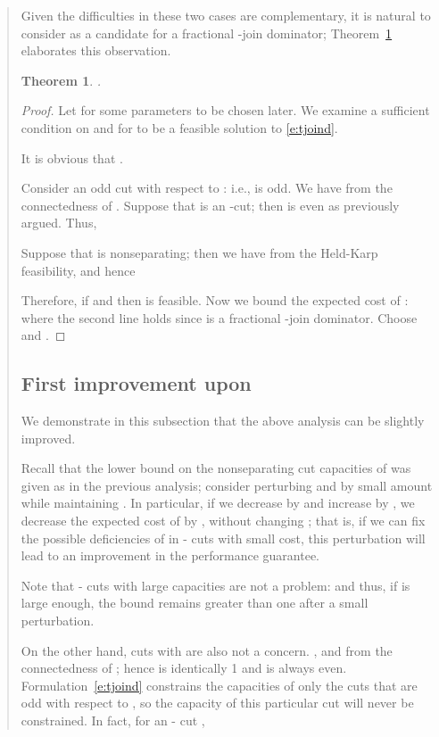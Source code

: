 \documentclass[11pt,letterpaper]{article}
\newtheorem{thm}{Theorem}
\newcommand{\st}{\mbox{-} }
\begin{document}
\begin{quote}
Given the difficulties in these two cases are complementary, it is natural to consider  as a candidate for a fractional -join dominator; Theorem~\ref{t:a53} elaborates this observation.

\begin{thm}\label{t:a53}
.
\end{thm}
\begin{proof}
Let  for some parameters  to be chosen later. We examine a sufficient condition on  and  for  to be a feasible solution to \eqref{e:tjoind}.

It is obvious that .

Consider an odd cut  with respect to : i.e.,  is odd. We have  from the connectedness of . Suppose that  is an -cut; then  is even as previously argued. Thus,

Suppose that  is nonseparating; then we have  from the Held-Karp feasibility, and hence

Therefore, if  and  then  is feasible.
Now we bound the expected cost of :
where the second line holds since  is a fractional -join dominator. Choose  and .
\end{proof}

\subsection{First improvement upon }

We demonstrate in this subsection that the above analysis can be slightly improved.

Recall that the lower bound on the nonseparating cut capacities of  was given as  in the previous analysis; consider perturbing  and  by small amount while maintaining . In particular, if we decrease  by  and increase  by , we decrease the expected cost of  by , without changing ; that is, if we can fix the possible deficiencies of  in \st cuts with small cost, this perturbation will lead to an improvement in the performance guarantee.

Note that \st cuts with large capacities are not a problem:  and thus, if  is large enough, the bound remains greater than one after a small perturbation.

On the other hand, cuts with  are also not a concern. , and  from the connectedness of ; hence  is identically 1 and  is always even. Formulation~\eqref{e:tjoind} constrains the capacities of only the cuts that are odd with respect to , so the capacity of this particular cut  will never be constrained. In fact, for an \st cut , 


\end{quote}
\end{document}
